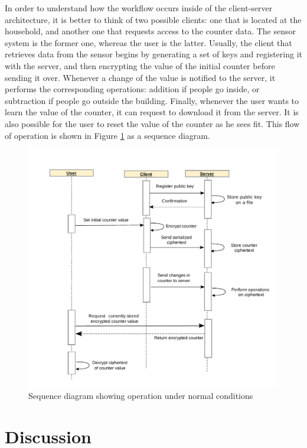 In order to understand how the workflow occurs inside of the client-server architecture, it is better to think of two possible clients: one that is located at the household, and another one that requests access to the counter data. The sensor system is the former one, whereas the user is the latter. Usually, the client that retrieves data from the sensor begins by generating a set of keys and registering it with the server, and then encrypting the value of the initial counter before sending it over. Whenever a change of the value is notified to the server, it performs the corresponding operations: addition if people go inside, or subtraction if people go outside the building. Finally, whenever the user wants to learn the value of the counter, it can request to download it from the server. It is also possible for the user to reset the value of the counter as he sees fit. This flow of operation is shown in Figure \ref{fig:seqdiag} as a sequence diagram.

\begin{figure}[H]
  \centering
  \includegraphics[scale=0.65]{img/counter}
  \caption{Sequence diagram showing operation under normal conditions}
  \label{fig:seqdiag}
\end{figure}

\section{Discussion}

